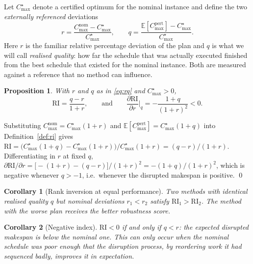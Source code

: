 \documentclass[a4paper,fleqn]{cas-sc}
\newtheorem{proposition}{Proposition}
\newtheorem{corollary}{Corollary}
\newcommand{\Cmax}{C_{\max}}
\newcommand{\RI}{\mathrm{RI}}
\begin{document}
Let $\Cmax^{\star}$ denote a certified optimum for the nominal instance and
define the two \emph{externally referenced} deviations
\begin{equation}\label{eq:rq}
  r=\frac{\Cmax^{\text{nom}}-\Cmax^{\star}}{\Cmax^{\star}},
  \qquad
  q=\frac{\mathbb{E}[\Cmax^{\text{pert}}]-\Cmax^{\star}}{\Cmax^{\star}} .
\end{equation}
Here $r$ is the familiar relative percentage deviation of the plan and $q$ is
what we will call \emph{realised quality}: how far the schedule that was
actually executed finished from the best schedule that existed for the nominal
instance. Both are measured against a reference that no method can influence.

\begin{proposition}\label{prop:ri}
With $r$ and $q$ as in \eqref{eq:rq} and $\Cmax^{\star}>0$,
\begin{equation}\label{eq:decomp}
  \RI=\frac{q-r}{1+r},
  \qquad\text{and}\qquad
  \frac{\partial \RI}{\partial r}\bigg|_{q}=-\frac{1+q}{(1+r)^{2}}<0 .
\end{equation}
\end{proposition}

\begin{pf}
Substituting $\Cmax^{\text{nom}}=\Cmax^{\star}(1+r)$ and
$\mathbb{E}[\Cmax^{\text{pert}}]=\Cmax^{\star}(1+q)$ into
Definition~\ref{def:ri} gives
$\RI=\big(\Cmax^{\star}(1+q)-\Cmax^{\star}(1+r)\big)/\Cmax^{\star}(1+r)
=(q-r)/(1+r)$. Differentiating in $r$ at fixed $q$,
$\partial\RI/\partial r=\big[-(1+r)-(q-r)\big]/(1+r)^2=-(1+q)/(1+r)^2$, which is
negative whenever $q>-1$, i.e.\ whenever the disrupted makespan is positive.
\qed
\end{pf}

\begin{corollary}[Rank inversion at equal performance]\label{cor:inv}
Two methods with identical realised quality $q$ but nominal deviations
$r_1<r_2$ satisfy $\RI_1>\RI_2$. The method with the worse plan receives the
better robustness score.
\end{corollary}

\begin{corollary}[Negative index]\label{cor:neg}
$\RI<0$ if and only if $q<r$: the expected disrupted makespan is \emph{below}
the nominal one. This can only occur when the nominal schedule was poor enough
that the disruption process, by reordering work it had sequenced badly, improves
it in expectation.
\end{corollary}
\end{document}
